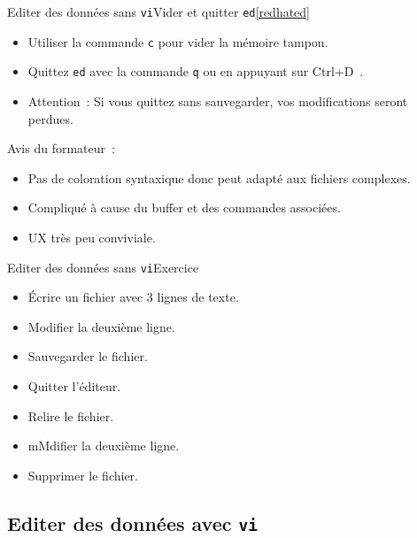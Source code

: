 \documentclass{beamer}
\begin{document}
    \begin{frame}{Editer des données sans \lstinline{vi}}{Vider et quitter \lstinline{ed}\cref{redhated}}
        \begin{itemize}
            \item Utiliser la commande \lstinline{c} pour vider la mémoire tampon.
            \item Quittez \lstinline{ed} avec la commande \lstinline{q} ou en appuyant sur Ctrl+D~.
            \item Attention~: Si vous quittez sans sauvegarder, vos modifications seront perdues.
        \end{itemize}
        \begin{dangercolorbox}
            Avis du formateur~:
            \begin{itemize}
                \item Pas de coloration syntaxique donc peut adapté aux fichiers complexes.
                \item Compliqué à cause du buffer et des commandes associées.
                \item UX très peu conviviale.
            \end{itemize}
        \end{dangercolorbox}
    \end{frame}

    \begin{frame}{Editer des données sans \lstinline{vi}}{Exercice \execcounterdispinc}
        \begin{itemize}
            \item Écrire un fichier avec 3 lignes de texte.
            \item Modifier la deuxième ligne.
            \item Sauvegarder le fichier.
            \item Quitter l'éditeur.
            \item Relire le fichier.
            \item mMdifier la deuxième ligne.
            \item Supprimer le fichier.
        \end{itemize}
    \end{frame}

    \subsection{Editer des données avec \lstinline{vi}}\label{subsec:edit-whith-vi}
\end{document}
